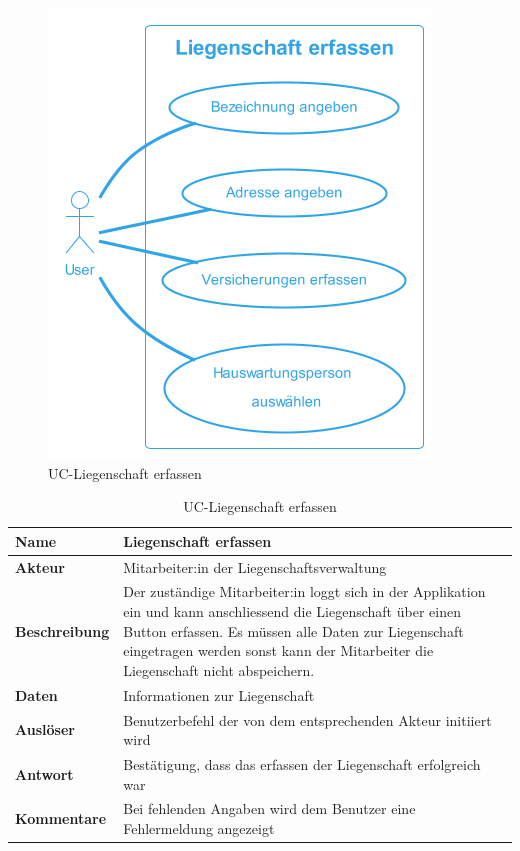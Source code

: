 \begin{figure}[H]
  \begin{center}
    \includegraphics[width=0.43\linewidth]{content/diagrams/out/usecase/liegenschaftErfassen/LiegenschaftErfassen.png}
    \caption{UC-Liegenschaft erfassen}
    \label{Liegenschaft}
  \end{center}
\end{figure}

\vspace*{-1cm}

\begin{table}[H]
  \centering
  \settowidth{}
  \setlength\extrarowheight{2pt}
  \begin{tabulary}{1.0\textwidth}{|a|m{14cm}|}
    \hline
    \textbf{Name}& Liegenschaft erfassen\\
    \hline
    \textbf{Akteur}& Mitarbeiter:in der Liegenschaftsverwaltung\\
    \hline 
    \textbf{Beschreibung} & Der zuständige Mitarbeiter:in loggt sich in der Applikation ein und kann anschliessend die Liegenschaft über einen Button erfassen. Es müssen alle Daten zur Liegenschaft eingetragen werden sonst kann der Mitarbeiter die Liegenschaft nicht abspeichern.\\
    \hline
    \textbf{Daten} & Informationen zur Liegenschaft\\
    \hline
    \textbf{Auslöser} & Benutzerbefehl der von dem entsprechenden Akteur initiiert wird\\
    \hline
    \textbf{Antwort} & Bestätigung, dass das erfassen der Liegenschaft erfolgreich war\\
    \hline
    \textbf{Kommentare} & Bei fehlenden Angaben wird dem Benutzer eine Fehlermeldung angezeigt\\
    \hline
  \end{tabulary}
  \caption{UC-Liegenschaft erfassen}
\end{table}

